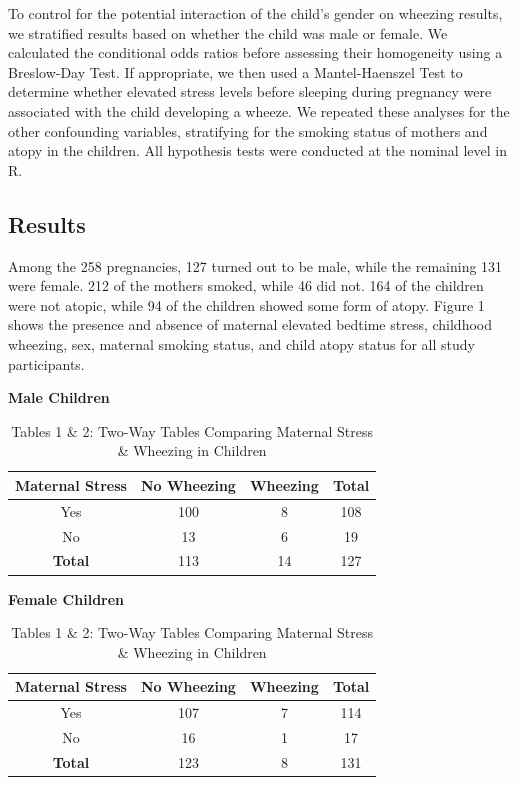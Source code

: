 \documentclass{article}
\begin{document}
	To control for the potential interaction of the child’s gender on wheezing results, we stratified results based on whether the child was male or female. We calculated the conditional odds ratios before assessing their homogeneity using a Breslow-Day Test. If appropriate, we then used a Mantel-Haenszel Test to determine whether elevated stress levels before sleeping during pregnancy were associated with the child developing a wheeze. We repeated these analyses for the other confounding variables, stratifying for the smoking status of mothers and atopy in the children. All hypothesis tests were conducted at the nominal level in R.

	\subsection*{Results}
	Among the 258 pregnancies, 127 turned out to be male, while the remaining 131 were female. 212 of the mothers smoked, while 46 did not. 164 of the children were not atopic, while 94 of the children showed some form of atopy. Figure 1 shows the presence and absence of maternal elevated bedtime stress, childhood wheezing, sex, maternal smoking status, and child atopy status for all study participants. 

	\begin{table}[h]
		\centering
		\captionsetup{labelformat=empty}
		\footnotesize
		\caption{Tables 1 \& 2: Two-Way Tables Comparing Maternal Stress \& Wheezing in Children}
		\begin{minipage}{0.48\linewidth}
			\centering
			\textbf{Male Children} \\[2pt]
			\begin{tabular}{cccc} %
				\toprule
				\textbf{Maternal Stress} & \textbf{No Wheezing} & \textbf{Wheezing} & \textbf{Total} \\
				\midrule
				Yes & 100 & 8 & 108 \\
				No & 13 & 6 & 19 \\
				\midrule
				\textbf{Total} & 113 & 14 & 127 \\
				\bottomrule
			\end{tabular}
		\end{minipage}
		\hfill
		\begin{minipage}{0.48\linewidth}
			\centering
			\textbf{Female Children} \\[2pt]
			\begin{tabular}{cccc} %
				\toprule
				\textbf{Maternal Stress} & \textbf{No Wheezing} & \textbf{Wheezing} & \textbf{Total} \\
				\midrule
				Yes & 107 & 7 & 114 \\
				No & 16 & 1 & 17 \\
				\midrule
				\textbf{Total} & 123 & 8 & 131 \\
				\bottomrule
			\end{tabular}
		\end{minipage}
	\end{table}
	
\end{document}
